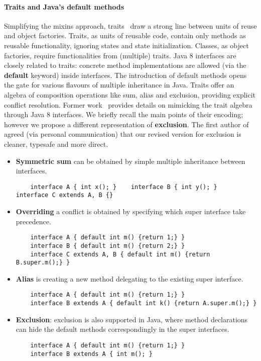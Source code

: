 \paragraph{Traits and Java's default methods}
Simplifying the mixins approach, traits~\cite{scharli03traits} draw a strong
line between units of reuse and object factories. Traits, as units of reusable
code, contain only methods as reusable functionality, ignoring states and state
initialization. Classes, as object factories, require functionalities from
(multiple) traits. Java 8 interfaces are closely related to
traits: concrete method implementations are allowed (via the \textbf{default}
keyword) inside interfaces. The introduction of default methods opens the gate
for various flavours of multiple inheritance in Java. Traits offer an algebra
of composition operations like sum, alias and exclusion, providing explicit conflict
resolution. Former work~\cite{bono14} provides details on mimicking the trait
algebra through Java 8 interfaces.  We briefly recall the main points of their
encoding; however we propose a different representation of \textbf{exclusion}.
The first author of~\cite{bono14} agreed (via personal communication) that 
our revised version for exclusion is cleaner, typesafe and more direct.

\newcommand\shortItem{\vspace{-1ex}}
\begin{itemize}
\item \textbf{Symmetric sum} can be obtained by simple multiple inheritance between interfaces.
    \begin{lstlisting}
    interface A { int x(); }    interface B { int y(); }    interface C extends A, B {}
    \end{lstlisting}
\shortItem
\item \textbf{Overriding} a conflict is obtained by specifying which super interface take precedence.
    \begin{lstlisting}
    interface A { default int m() {return 1;} } 
    interface B { default int m() {return 2;} }
    interface C extends A, B { default int m() {return B.super.m();} }
    \end{lstlisting}
\shortItem
\item \textbf{Alias} is creating  a new method delegating to the existing super interface.
    \begin{lstlisting}
    interface A { default int m() {return 1;} }
    interface B extends A { default int k() {return A.super.m();} }
    \end{lstlisting}
\shortItem

\item \textbf{Exclusion}: exclusion is also supported in Java, where method declarations can hide the default methods correspondingly in the super interfaces.
    \begin{lstlisting}
    interface A { default int m() {return 1;} }
    interface B extends A { int m(); }
    \end{lstlisting}
\shortItem
\end{itemize}


